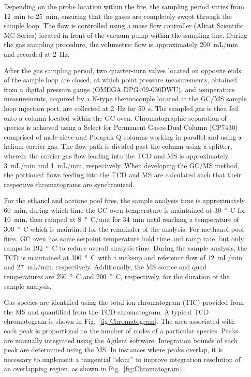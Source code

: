 \documentclass[12pt]{article}
\begin{document}
Depending on the probe location within the fire, the sampling period varies from \SI{12}{min} to \SI{25}{min}, ensuring that the gases are completely swept through the sample loop. The flow is controlled using a mass flow controller (Alicat Scientific MC-Series) located in front of the vacuum pump within the sampling line. During the gas sampling procedure, the volumetric flow is approximately 200~mL/min and recorded at \SI{2}{\hertz}.

After the gas sampling period, two quarter-turn valves located on opposite ends of the sample loop are closed, at which point pressure measurements, obtained from a digital pressure gauge (OMEGA DPG409-030DWU), and temperature measurements, acquired by a K-type thermocouple located at the GC/MS sample loop injection port, are collected at \SI{2}{\hertz} for \SI{50}{s}. The sampled gas is then fed onto a column located within the GC oven. Chromatographic separation of species is achieved using a Select for Permanent Gases-Dual Column (CP7430) comprised of mole-sieve and Porapak Q columns working in parallel and using a helium carrier gas. The flow path is divided past the column using a splitter, wherein the carrier gas flow leading into the TCD and MS is approximately 3~mL/min and 1~mL/min, respectively. When developing the GC/MS method, the portioned flows feeding into the TCD and MS are calculated such that their respective chromatograms are synchronized.

For the ethanol and acetone pool fires, the sample analysis time is approximately \SI{60}{min}, during which time the GC oven temperature is maintained at \SI{30}{\degree C} for \SI{10}{min}, then ramped at \SI{8}{\degree C/min} for \SI{34}{min} until reaching a temperature of \SI{300}{\degree C} which is maintined for the remainder of the analysis. For methanol pool fires, GC oven has same setpoint temperature hold time and ramp rate, but only ramps to \SI{192}{\degree C} to reduce overall analysis time. During the sample analysis, the TCD is maintained at \SI{300}{\degree C} with a makeup and reference flow of 12~mL/min and 27~mL/min, respectively. Additionally, the MS source and quad temperatures are \SI{250}{\degree C} and \SI{200}{\degree C}, respectively, for the duration of the sample analysis.

Gas species are identified using the total ion chromatogram (TIC) provided from the MS and quantified from the TCD chromatogram. A typical TCD chromatogram is shown in Fig.~\ref{fig:Chromatogram}. The area associated with each peak is proportional to the number of moles of a particular species. Peaks are manually integrated using the Agilent software. Integration bounds of each peak are determined using the MS. In instances where peaks overlap, it is necessary to implement a tangential ``skim'' to improve integration resolution of an overlapping region, as shown in Fig.~\ref{fig:Chromatogram}.
\end{document}
